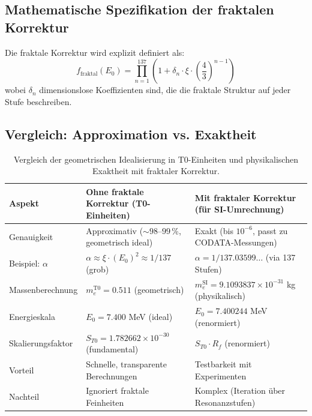	\subsection{Mathematische Spezifikation der fraktalen Korrektur}
	
	Die fraktale Korrektur wird explizit definiert als:
	\begin{equation}
		f_{\text{fraktal}}(E_0) = \prod_{n=1}^{137} \left(1 + \delta_n \cdot \xi \cdot \left(\frac{4}{3}\right)^{n-1}\right)
	\end{equation}
	wobei $\delta_n$ dimensionslose Koeffizienten sind, die die fraktale Struktur auf jeder Stufe beschreiben.
	
	\subsection{Vergleich: Approximation vs. Exaktheit}
	
\begin{table}[h]
	\centering
	\caption{Vergleich der geometrischen Idealisierung in T0-Einheiten und physikalischen Exaktheit mit fraktaler Korrektur.}
	\label{tab:approximation-exaktheit}
	\begin{tabular}{p{3.5cm}p{6cm}p{6cm}}
			\toprule
			\textbf{Aspekt} & \textbf{Ohne fraktale Korrektur (T0-Einheiten)} & \textbf{Mit fraktaler Korrektur (für SI-Umrechnung)} \\
			\midrule
			Genauigkeit & Approximativ ($\sim 98$--$99$\,\%, geometrisch ideal) & Exakt (bis $10^{-6}$, passt zu CODATA-Messungen) \\
			Beispiel: $\alpha$ & $\alpha \approx \xi \cdot (E_0)^2 \approx 1/137$ (grob) & $\alpha = 1/137.03599\dots$ (via 137 Stufen) \\
			Massenberechnung & $m_e^{\mathrm{T0}} = 0.511$ (geometrisch) & $m_e^{\mathrm{SI}} = 9.1093837\times 10^{-31}$ kg (physikalisch) \\
			Energieskala & $E_0 = 7.400$ MeV (ideal) & $E_0 = 7.400244$ MeV (renormiert) \\
			Skalierungsfaktor & $S_{T0} = 1.782662\times 10^{-30}$ (fundamental) & $S_{T0} \cdot R_f$ (renormiert) \\
			Vorteil & Schnelle, transparente Berechnungen & Testbarkeit mit Experimenten \\
			Nachteil & Ignoriert fraktale Feinheiten & Komplex (Iteration über Resonanzstufen) \\
			\bottomrule
		\end{tabular}
\end{table}
	
